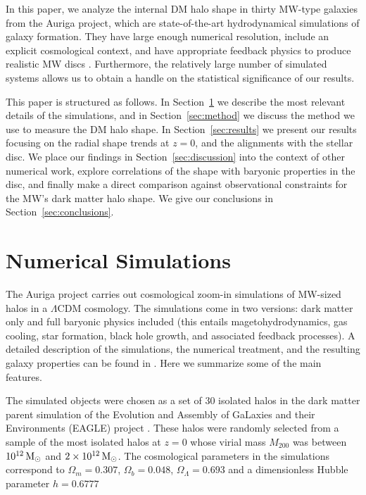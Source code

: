 \documentclass[usenatbib]{mnras}
\begin{document}
In this paper, we analyze the internal DM halo shape in thirty MW-type
galaxies  from the Auriga project, which are state-of-the-art hydrodynamical simulations of galaxy formation.
They have large enough numerical resolution, include an explicit
cosmological context, and have appropriate feedback physics to produce
realistic MW discs \citep{auriga,GBG18,GHF18}.
Furthermore, the relatively large number of simulated systems allows us
to obtain a handle on the statistical significance of our results.

This paper is structured as follows. 
In Section~\ref{sec:numerical} we describe the most relevant details of
the simulations, and in Section~\ref{sec:method} we discuss the method
we use to measure the DM halo shape. 
In Section~\ref{sec:results} we present our results focusing on the
radial shape trends at $z=0$, and the alignments with the stellar disc.
We place our findings in Section~\ref{sec:discussion} 
into the context of other numerical work, explore correlations of the
shape with baryonic properties in the disc, and finally make a direct
comparison against observational constraints for the MW's dark matter halo shape.
We give our conclusions in Section~\ref{sec:conclusions}.


\section{Numerical Simulations}
\label{sec:numerical}

The Auriga project carries out cosmological zoom-in simulations of MW-sized 
halos in a $\Lambda$CDM cosmology. 
The simulations come in two versions: dark matter only and full 
baryonic physics included (this entails magetohydrodynamics, gas cooling, star formation, black hole growth, and associated feedback processes).
A detailed description of the simulations, the numerical treatment, and the resulting galaxy properties can be found in \citet{auriga}.
Here we summarize some of the main features.

The simulated objects were chosen as a set of 30
isolated halos in the dark matter parent simulation of the Evolution and Assembly of GaLaxies and their
Environments (EAGLE)  project \citep{Eagle}.   
These halos were randomly selected from a sample of the most isolated
halos at $z=0$ whose virial mass $M_{200}$ was between $10^{12}\, {\rm M}_\odot$ and
$2\times 10^{12}\, {\rm M}_\odot$. 
The cosmological parameters in the simulations correspond to
$\Omega_m=0.307$, $\Omega_b=0.048$, $\Omega_\Lambda=0.693$ and a
dimensionless Hubble parameter $h=0.6777$ \citep{2014A&A...571A..16P}
\end{document}

